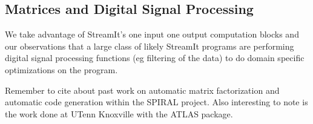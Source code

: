 \subsection{Matrices and Digital Signal Processing}  
We take advantage of StreamIt's one input one output computation blocks and 
our observations that a large class of likely StreamIt programs are performing
digital signal processing functions (eg filtering of the data) to do domain specific
optimizations on the program.

Remember to cite \cite{xiong-thesis,xiong01spl,johnson01searching,egner01automatic} about
past work on automatic matrix factorization and automatic code generation within the 
SPIRAL\cite{spiral} project. Also interesting to note is the work done at UTenn Knoxville 
with the ATLAS package\cite{whaley01automated}.
